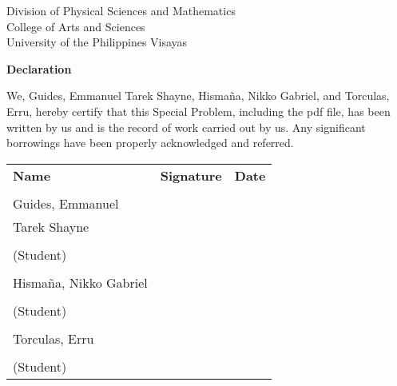 \begin{center}
	Division of Physical Sciences and Mathematics\\
	College of Arts and Sciences\\
	University of the Philippines Visayas 
	
		\textbf{Declaration}
		\end{center}

We,  Guides, Emmanuel Tarek Shayne, Hismaña, Nikko Gabriel, and Torculas, Erru, hereby certify that this Special Problem, including the pdf file, has been written by us  and is the record of work carried out by us. Any significant borrowings have been properly acknowledged and referred.

	\begin{tabular}{lll}
	\bfseries Name  & \bfseries Signature & \bfseries Date\\ \\
    Guides, Emmanuel \\ Tarek Shayne \\
	\signaturerule &\signaturerule  & \signaturerule\\ 
	(Student)\\ \\
    Hismaña, Nikko Gabriel \\
	\signaturerule &\signaturerule &\signaturerule\\
	(Student)\\ \\
    Torculas, Erru \\
	\signaturerule &\signaturerule &\signaturerule\\
	(Student)
\end{tabular}



